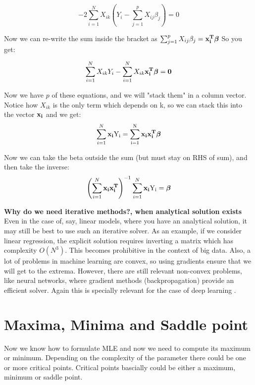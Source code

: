 \begin{equation}
    -2\sum_{i=1}^{N}X_{ik}\left(Y_{i}-\sum_{j=1}^{p}X_{ij}\beta_{j}\right)=0
\end{equation}

\noindent Now we can re-write the sum inside the bracket as $\sum_{j=1}^{p}X_{ij}\beta_{j}=\bf{x}_{i}^{T}\boldsymbol{\beta}$ So you get:

\begin{equation}
\sum_{i=1}^{N}X_{ik}Y_{i}-\sum_{i=1}^{N}X_{ik}\bf{x}_{i}^{T}\boldsymbol{\beta}=0    
\end{equation}

\noindent Now we have $p$ of these equations, and we will "stack them" in a column vector. Notice how $X_{ik}$ is the only term which depends on k, so we can stack this into the vector $\bf{x}_{i}$ and we get:
\begin{equation}
\sum_{i=1}^{N}\bf{x}_{i}\rm{Y}_{i}=\sum_{i=1}^{N}\bf{x}_{i}\bf{x}_{i}^{T}\boldsymbol{\beta}    
\end{equation}

\noindent Now we can take the beta outside the sum (but must stay on RHS of sum), and then take the inverse:
\begin{equation}
\left(\sum_{i=1}^{N}\bf{x}_{i}\bf{x}_{i}^{T}\right)^{-1}\sum_{i=1}^{N}\bf{x}_{i}\rm{Y}_{i}=\boldsymbol{\beta}
\end{equation}

\noindent\textbf{Why do we need iterative methods?, when analytical solution exists}\cite{iter} \\

\noindent Even in the case of, say, linear models, where you have an analytical solution, it may still be best to use such an iterative solver. As an example, if we consider linear regression, the explicit solution requires inverting a matrix which has complexity $O(N^3)$. This becomes prohibitive in the context of big data. Also, a lot of problems in machine learning are convex, so using gradients ensure that we will get to the extrema. However, there are still relevant non-convex problems, like neural networks, where gradient methods (backpropagation) provide an efficient solver. Again this is specially relevant for the case of deep learning \cite{iter}.

\section{Maxima, Minima and Saddle point}
Now we know how to formulate MLE and now we need to compute its maximum or minimum. Depending on the complexity of the parameter there could be one or more critical points. Critical points bascially could be either a maximum, minimum or saddle point. 
